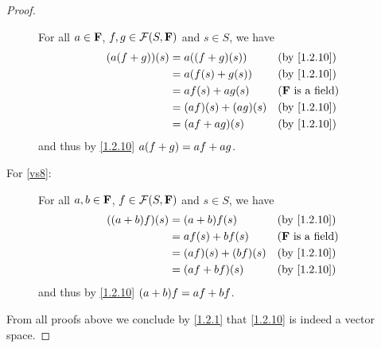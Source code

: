 \begin{proof}
\begin{description}
            For all \(a \in \mathbf{F}\), \(f, g \in \FS\) and \(s \in S\), we have
            \begin{align*}
                \p{a \p{f + g}}\p{s} & = a \p{\p{f + g}\p{s}}      &  & \text{(by \cref{1.2.10})}  \\
                                     & = a \p{f\p{s} + g\p{s}}     &  & \text{(by \cref{1.2.10})}  \\
                                     & = af\p{s} + ag\p{s}         &  & \text{(\(\F\) is a field)} \\
                                     & = \p{af}\p{s} + \p{ag}\p{s} &  & \text{(by \cref{1.2.10})}  \\
                                     & = \p{af + ag}\p{s}          &  & \text{(by \cref{1.2.10})}
            \end{align*}
            and thus by \cref{1.2.10} \(a \p{f + g} = af + ag\).
        \item[For \ref{vs8}:]
            For all \(a, b \in \mathbf{F}\), \(f \in \FS\) and \(s \in S\), we have
            \begin{align*}
                \p{\p{a + b} f}\p{s} & = \p{a + b} f\p{s}          &  & \text{(by \cref{1.2.10})}  \\
                                     & = af\p{s} + bf\p{s}         &  & \text{(\(\F\) is a field)} \\
                                     & = \p{af}\p{s} + \p{bf}\p{s} &  & \text{(by \cref{1.2.10})}  \\
                                     & = \p{af + bf}\p{s}          &  & \text{(by \cref{1.2.10})}
            \end{align*}
            and thus by \cref{1.2.10} \(\p{a + b} f = af + bf\).
    \end{description}
    From all proofs above we conclude by \cref{1.2.1} that \cref{1.2.10} is indeed a vector space.
\end{proof}


